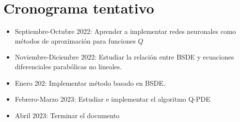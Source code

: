 \documentclass[a4paper,11pt]{scrartcl}
\begin{document}
	\section{Cronograma tentativo}
\begin{itemize}
	\item Septiembre-Octubre 2022: Aprender a implementar redes neuronales como métodos de aproximación para funciones $Q$
	\item Noviembre-Diciembre 2022: Estudiar la relación entre BSDE y ecuaciones diferenciales parabólicas no lineales.
	\item Enero 202: Implementar método basado en BSDE.
	\item Febrero-Marzo 2023: Estudiar e implementar el algoritmo Q-PDE 
	\item Abril 2023: Terminar el documento
\end{itemize}
\nocite{*}
	
	
	
\end{document}
